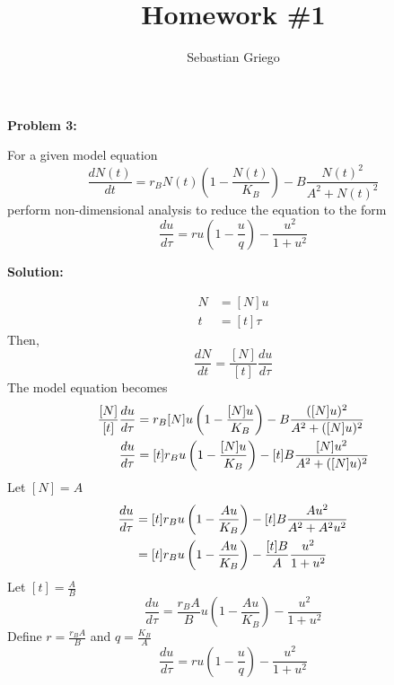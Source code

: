 \documentclass[12pt]{article}
\newenvironment{problem}[1]{
\textbf{Problem #1:}
}{
\rmfamily \vspace{1em}
}
\newenvironment{solution}{
\textbf{Solution:}

}{

\vspace{2em}
}
\begin{document}
\title{Homework \#1}  %
\author{Sebastian Griego}  %

\begin{problem}{3}
    For a given model equation
    \[
        \frac{dN(t)}{dt} = r_B N(t) \left( 1 - \frac{N(t)}{K_B} \right) - B \frac{N(t)^2}{A^2 + N(t)^2}
    \]
    perform non-dimensional analysis to reduce the equation to the form
    \[
        \frac{du}{d\tau} = ru\left(1 - \frac{u}{q}\right) - \frac{u^2}{1 + u^2}
    \]
\end{problem}

\begin{solution}
    \[
        \begin{aligned}
            N & = [N]u \\
            t & = [t]\tau
        \end{aligned}
    \]
    Then,
    \[
        \frac{dN}{dt} = \frac{[N]}{[t]} \frac{du}{d\tau}
    \]
    The model equation becomes
    \[
        \begin{aligned}\relax
            \frac{[N]}{[t]} \frac{du}{d\tau} &= r_B [N]u \left( 1 - \frac{[N]u}{K_B} \right) - B \frac{([N]u)^2}{A^2 + ([N]u)^2} \\
            \frac{du}{d\tau} &= [t]r_B u \left( 1 - \frac{[N]u}{K_B} \right) - [t]B \frac{[N]u^2}{A^2 + ([N]u)^2}
        \end{aligned}
    \]
    Let \([N] = A\)
    \[
        \begin{aligned}\relax
            \frac{du}{d\tau} &= [t]r_B u \left( 1 - \frac{Au}{K_B} \right) - [t]B \frac{Au^2}{A^2 + A^2u^2} \\
            &= [t]r_B u \left( 1 - \frac{Au}{K_B} \right) - \frac{[t]B}{A} \frac{u^2}{1 + u^2}
        \end{aligned}
    \]
    Let \([t] = \frac{A}{B}\)
    \[
        \frac{du}{d\tau} = \frac{r_B A}{B} u \left( 1 - \frac{Au}{K_B} \right) - \frac{u^2}{1 + u^2}
    \]
    Define \(r = \frac{r_B A}{B}\) and \(q = \frac{K_B}{A}\)
    \[
        \frac{du}{d\tau} = r u \left( 1 - \frac{u}{q} \right) - \frac{u^2}{1 + u^2}
    \]
    
\end{solution}
\end{document}
